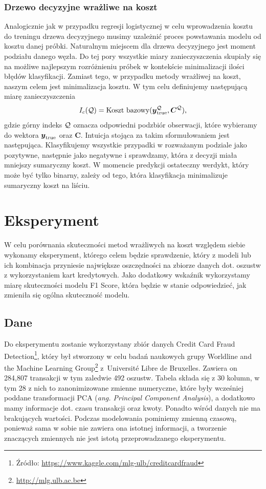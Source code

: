 \documentclass[inzynierska]{pwr_wmat_praca_dyplomowa}
\theoremstyle{plain}
\numberwithin{theorem}{chapter}
\theoremstyle{definition}
\numberwithin{theorem}{chapter}
\begin{document}
\subsection{Drzewo decyzyjne wrażliwe na koszt}
\label{csdt}
Analogicznie jak w przypadku regresji logistycznej w celu wprowadzenia kosztu do treningu drzewa decyzyjnego musimy uzależnić proces powstawania modelu od kosztu danej próbki. Naturalnym miejscem dla drzewa decyzyjnego jest moment podziału danego węzła. Do tej pory wszystkie miary zanieczyszczenia skupiały się na możliwe najlepszym rozróżnieniu próbek w kontekście minimalizacji ilości błędów klasyfikacji. Zamiast tego, w przypadku metody wrażliwej na koszt, naszym celem jest minimalizacja kosztu. W tym celu definiujemy następującą miarę zanieczyszczenia
$$ I_c(\mathcal{Q}) = \text{Koszt bazowy}(\boldsymbol{y}_{\text{true}}^{\mathcal{Q}}, \boldsymbol{C}^{\mathcal{Q}}) \text{,}$$
gdzie górny indeks $\mathcal{Q}$ oznacza odpowiedni podzbiór obserwacji, które wybieramy do wektora $\boldsymbol{y}_{\text{true}}$ oraz $\boldsymbol{C}$. Intuicja stojąca za takim sformułowaniem jest następująca. Klasyfikujemy wszystkie przypadki w rozważanym podziale jako pozytywne, następnie jako negatywne i sprawdzamy, która z decyzji miała mniejszy sumaryczny koszt. W momencie predykcji ostateczny werdykt, który może być tylko binarny, zależy od tego, która klasyfikacja minimalizuje sumaryczny koszt na liściu.

\chapter{Eksperyment}
W celu porównania skuteczności metod wrażliwych na koszt względem siebie wykonamy eksperyment, którego celem będzie sprawdzenie, który z modeli lub ich kombinacja przyniesie największe oszczędności na zbiorze danych dot. oszustw z wykorzystaniem kart kredytowych. Jako dodatkowy wskaźnik wykorzystamy miarę skuteczności modelu F1 Score, która będzie w stanie odpowiedzieć, jak zmieniła się ogólna skuteczność modelu.


\section{Dane}
Do eksperymentu zostanie wykorzystany zbiór danych Credit Card Fraud Detection\footnote{Źródło: \url{https://www.kaggle.com/mlg-ulb/creditcardfraud}}, który był stworzony w celu badań naukowych grupy Worldline and the Machine Learning Group\footnote{\url{http://mlg.ulb.ac.be}} z~Université Libre de Bruxelles. Zawiera on 284,807 transakcji w tym zaledwie 492 oszustw. Tabela składa się z 30 kolumn, w tym 28 z nich to zanonimizowane zmienne numeryczne, które były wcześniej poddane transformacji PCA (\textit{ang. Principal Component Analysis}), a dodatkowo mamy informacje dot. czasu transakcji oraz kwoty. Ponadto wśród danych nie ma brakujących wartości. Podczas modelowania pominiemy zmienną czasową, ponieważ sama w sobie nie zawiera ona istotnej informacji, a tworzenie znaczących zmiennych nie jest istotą przeprowadzanego eksperymentu. 
\end{document}

